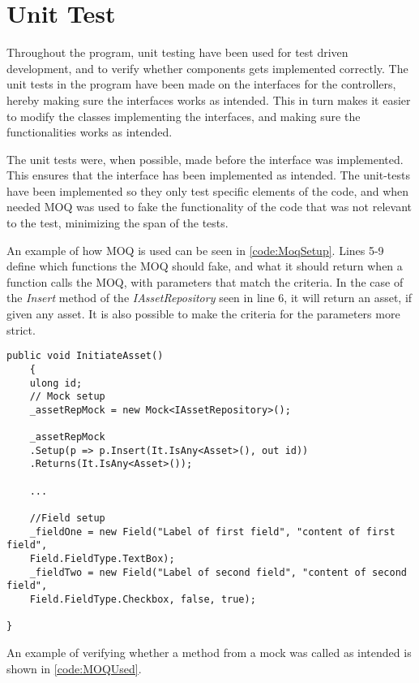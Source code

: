 \section{Unit Test} \label{sc:UnitTest}
Throughout the program, unit testing have been used for test driven development, and to verify whether components gets implemented correctly. The unit tests in the program have been made on the interfaces for the controllers, hereby making sure the interfaces works as intended. This in turn makes it easier to modify the classes implementing the interfaces, and making sure the functionalities works as intended. 
\par
The unit tests were, when possible, made before the interface was implemented. This ensures that the interface has been implemented as intended. The unit-tests have been implemented so they only test specific elements of the code, and when needed MOQ \citep{MoqReference} was used to fake the functionality of the code that was not relevant to the test, minimizing the span of the tests. 
\par
An example of how MOQ is used can be seen in \autoref{code:MoqSetup}. Lines 5-9 define which functions the MOQ should fake, and what it should return when a function calls the MOQ, with parameters that match the criteria. In the case of the \textit{Insert} method of the \textit{IAssetRepository} seen in line 6, it will return an asset, if given any asset. It is also possible to make the criteria for the parameters more strict. 

\begin{listing}[H]
\begin{verbatim}
public void InitiateAsset()
    {
    ulong id;
    // Mock setup
    _assetRepMock = new Mock<IAssetRepository>();
    
    _assetRepMock
    .Setup(p => p.Insert(It.IsAny<Asset>(), out id))
    .Returns(It.IsAny<Asset>());
    
    ...
    
    //Field setup
    _fieldOne = new Field("Label of first field", "content of first field",
    Field.FieldType.TextBox);
    _fieldTwo = new Field("Label of second field", "content of second field",
    Field.FieldType.Checkbox, false, true);
    
}
\end{verbatim}
\label{code:MoqSetup}
\end{listing}
\par
An example of verifying whether a method from a mock was called as intended is shown in \autoref{code:MOQUsed}.

